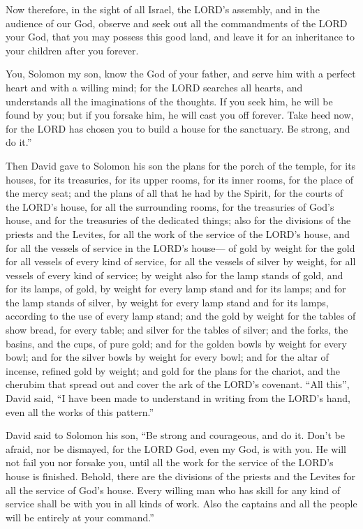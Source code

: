  Now therefore, in the sight of all Israel, the LORD's
assembly, and in the audience of our God, observe and seek out all the
commandments of the LORD your God, that you may possess this good land,
and leave it for an inheritance to your children after you forever.

 You, Solomon my son, know the God of your father, and
serve him with a perfect heart and with a willing mind; for the LORD
searches all hearts, and understands all the imaginations of the
thoughts. If you seek him, he will be found by you; but if you forsake
him, he will cast you off forever.  Take heed now, for
the LORD has chosen you to build a house for the sanctuary. Be strong,
and do it.''

 Then David gave to Solomon his son the plans for the
porch of the temple, for its houses, for its treasuries, for its upper
rooms, for its inner rooms, for the place of the mercy seat;
 and the plans of all that he had by the Spirit, for the
courts of the LORD's house, for all the surrounding rooms, for the
treasuries of God's house, and for the treasuries of the dedicated
things;  also for the divisions of the priests and the
Levites, for all the work of the service of the LORD's house, and for
all the vessels of service in the LORD's house---  of
gold by weight for the gold for all vessels of every kind of service,
for all the vessels of silver by weight, for all vessels of every kind
of service;  by weight also for the lamp stands of gold,
and for its lamps, of gold, by weight for every lamp stand and for its
lamps; and for the lamp stands of silver, by weight for every lamp stand
and for its lamps, according to the use of every lamp stand;
 and the gold by weight for the tables of show bread, for
every table; and silver for the tables of silver;  and
the forks, the basins, and the cups, of pure gold; and for the golden
bowls by weight for every bowl; and for the silver bowls by weight for
every bowl;  and for the altar of incense, refined gold
by weight; and gold for the plans for the chariot, and the cherubim that
spread out and cover the ark of the LORD's covenant. 
``All this'', David said, ``I have been made to understand in writing
from the LORD's hand, even all the works of this pattern.''

 David said to Solomon his son, ``Be strong and
courageous, and do it. Don't be afraid, nor be dismayed, for the LORD
God, even my God, is with you. He will not fail you nor forsake you,
until all the work for the service of the LORD's house is finished.
 Behold, there are the divisions of the priests and the
Levites for all the service of God's house. Every willing man who has
skill for any kind of service shall be with you in all kinds of work.
Also the captains and all the people will be entirely at your command.''

